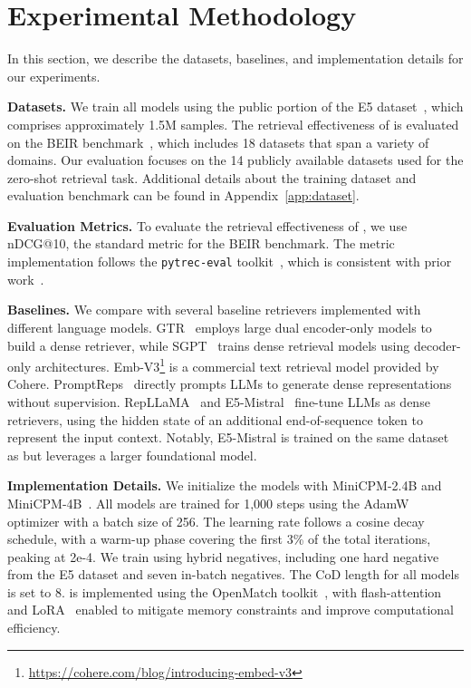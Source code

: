 \section{Experimental Methodology}
In this section, we describe the datasets, baselines, and implementation details for our experiments.


\textbf{Datasets.} 
We train all \method{} models using the public portion of the E5 dataset~\cite{wang2023improving,springer2024repetition}, which comprises approximately 1.5M samples. 
The retrieval effectiveness of \method{} is evaluated on the BEIR benchmark~\cite{thakur2021beir}, which includes 18 datasets that span a variety of domains.
Our evaluation focuses on the 14 publicly available datasets used for the zero-shot retrieval task. 
Additional details about the training dataset and evaluation benchmark can be found in Appendix~\ref{app:dataset}.

\textbf{Evaluation Metrics.}
To evaluate the retrieval effectiveness of \method{}, we use nDCG@10, the standard metric for the BEIR benchmark. The metric implementation follows the \texttt{pytrec-eval} toolkit~\cite{van2018pytrec_eval}, which is consistent with prior work~\cite{zhu2023large}.

\textbf{Baselines.}
We compare \method{} with several baseline retrievers implemented with different language models. GTR~\cite{ni2021large} employs large dual encoder-only models to build a dense retriever, while SGPT~\cite{muennighoff2022sgpt} trains dense retrieval models using decoder-only architectures. Emb-V3\footnote{\url{https://cohere.com/blog/introducing-embed-v3}} is a commercial text retrieval model provided by Cohere. PromptReps~\cite{zhuang2024promptreps} directly prompts LLMs to generate dense representations without supervision. RepLLaMA~\cite{ma2024fine} and E5-Mistral~\cite{wang2024multilingual} fine-tune LLMs as dense retrievers, using the hidden state of an additional end-of-sequence token to represent the input context. Notably, E5-Mistral is trained on the same dataset as \method{} but leverages a larger foundational model.

\textbf{Implementation Details.}
We initialize the \method{} models with MiniCPM-2.4B and MiniCPM-4B~\cite{hu2024minicpm}. All \method{} models are trained for 1,000 steps using the AdamW optimizer with a batch size of 256. The learning rate follows a cosine decay schedule, with a warm-up phase covering the first 3\% of the total iterations, peaking at 2e-4. We train \method{} using hybrid negatives, including one hard negative from the E5 dataset and seven in-batch negatives. The CoD length for all \method{} models is set to 8. \method{} is implemented using the OpenMatch toolkit~\cite{yu2023openmatch}, with flash-attention~\cite{NEURIPS2022_67d57c32} and LoRA~\cite{hu2021lora} enabled to mitigate memory constraints and improve computational efficiency. %

